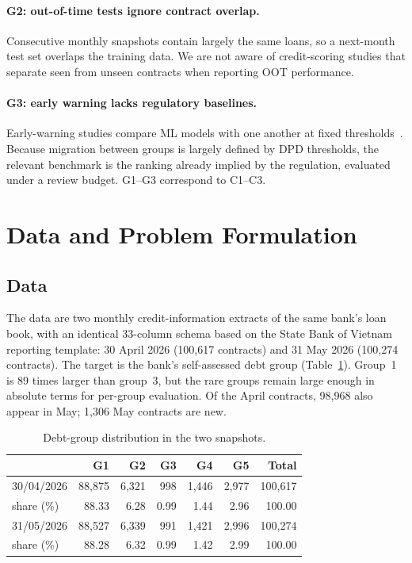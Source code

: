 \documentclass[runningheads]{llncs}
\begin{document}
\paragraph{G2: out-of-time tests ignore contract overlap.} Consecutive monthly snapshots contain largely the same loans, so a next-month test set overlaps the training data. We are not aware of credit-scoring studies that separate seen from unseen contracts when reporting OOT performance.

\paragraph{G3: early warning lacks regulatory baselines.} Early-warning studies compare ML models with one another at fixed thresholds~\cite{nguyen2024ews}. Because migration between groups is largely defined by DPD thresholds, the relevant benchmark is the ranking already implied by the regulation, evaluated under a review budget. G1--G3 correspond to C1--C3.

\section{Data and Problem Formulation}
\label{sec:data}

\subsection{Data}

The data are two monthly credit-information extracts of the same bank's loan book, with an identical 33-column schema based on the State Bank of Vietnam reporting template: 30 April 2026 (100,617 contracts) and 31 May 2026 (100,274 contracts). The target is the bank's self-assessed debt group (Table~\ref{tab:dist}). Group~1 is 89 times larger than group~3, but the rare groups remain large enough in absolute terms for per-group evaluation. Of the April contracts, 98,968 also appear in May; 1,306 May contracts are new.

\begin{table}[t]
\centering
\caption{Debt-group distribution in the two snapshots.}
\label{tab:dist}
\small
\begin{tabular}{@{}lrrrrrr@{}}
\toprule
& G1 & G2 & G3 & G4 & G5 & Total\\
\midrule
30/04/2026 & 88,875 & 6,321 & 998 & 1,446 & 2,977 & 100,617\\
\quad share (\%) & 88.33 & 6.28 & 0.99 & 1.44 & 2.96 & 100.00\\
31/05/2026 & 88,527 & 6,339 & 991 & 1,421 & 2,996 & 100,274\\
\quad share (\%) & 88.28 & 6.32 & 0.99 & 1.42 & 2.99 & 100.00\\
\bottomrule
\end{tabular}
\end{table}
\end{document}
